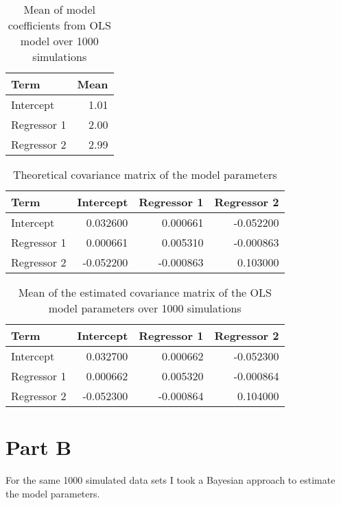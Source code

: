 \documentclass[]{book}
\begin{document}
\begin{table}

\caption{\label{tab:lm-mean-coefs-q3}Mean of model coefficients from OLS model over 1000 simulations}
\centering
\begin{tabular}[t]{lr}
\toprule
Term & Mean\\
\midrule
Intercept & 1.01\\
Regressor 1 & 2.00\\
Regressor 2 & 2.99\\
\bottomrule
\end{tabular}
\end{table}

\begin{table}

\caption{\label{tab:theory-vcov-q3}Theoretical covariance matrix of the model parameters}
\centering
\begin{tabular}[t]{lrrr}
\toprule
Term & Intercept & Regressor 1 & Regressor 2\\
\midrule
Intercept & 0.032600 & 0.000661 & -0.052200\\
Regressor 1 & 0.000661 & 0.005310 & -0.000863\\
Regressor 2 & -0.052200 & -0.000863 & 0.103000\\
\bottomrule
\end{tabular}
\end{table}

\begin{table}

\caption{\label{tab:lm-est-vcov-q3}Mean of the estimated covariance matrix of the OLS model parameters over 1000 simulations}
\centering
\begin{tabular}[t]{lrrr}
\toprule
Term & Intercept & Regressor 1 & Regressor 2\\
\midrule
Intercept & 0.032700 & 0.000662 & -0.052300\\
Regressor 1 & 0.000662 & 0.005320 & -0.000864\\
Regressor 2 & -0.052300 & -0.000864 & 0.104000\\
\bottomrule
\end{tabular}
\end{table}

\hypertarget{part-b-2}{%
\section{Part B}\label{part-b-2}}

For the same 1000 simulated data sets I took a Bayesian approach to estimate the model parameters.
\end{document}
